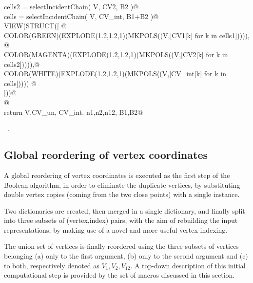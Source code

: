 \documentclass[11pt,oneside]{article}	%
\begin{document}
\begin{flushleft}
\begin{list}{}{}
\mbox{}\verb@   cells2 = selectIncidentChain( V, CV2, B2 )@\\
\mbox{}\verb@   cells = selectIncidentChain( V, CV_int, B1+B2 )@\\
\mbox{}\verb@   VIEW(STRUCT([ @\\
\mbox{}\verb@      COLOR(GREEN)(EXPLODE(1.2,1.2,1)(MKPOLS((V,[CV1[k] for k in cells1])))), @\\
\mbox{}\verb@      COLOR(MAGENTA)(EXPLODE(1.2,1.2,1)(MKPOLS((V,[CV2[k] for k in cells2])))),@\\
\mbox{}\verb@      COLOR(WHITE)(EXPLODE(1.2,1.2,1)(MKPOLS((V,[CV_int[k] for k in cells])))) @\\
\mbox{}\verb@      ]))@\\
\mbox{}\verb@   @\\
\mbox{}\verb@   return V,CV_un, CV_int, n1,n2,n12, B1,B2@\\
\mbox{}\verb@@{\NWsep}
\end{list}
\vspace{-1ex}
\footnotesize\addtolength{\baselineskip}{-1ex}
\begin{list}{}{\setlength{\itemsep}{-\parsep}\setlength{\itemindent}{-\leftmargin}}
\item \NWtxtMacroRefIn\ .
\end{list}
\end{flushleft}
\subsection{Global reordering of vertex coordinates}
A global reordering of vertex coordinates is executed as the first step of the Boolean algorithm, in order to eliminate the duplicate vertices, by substituting double vertex copies (coming from the two close points) with a single instance. 

Two dictionaries are created, then merged in a single dictionary, and finally split into three subsets of (vertex,index) pairs, with the aim of rebuilding the input representations, by making use of a novel and more useful vertex indexing.

The union set of vertices is finally reordered using the three subsets of vertices belonging (a) only to the first argument, (b) only to the second argument and (c) to both, respectively denoted as $V_1, V_2, V_{12}$. A top-down description of this initial computational step is provided by the set of macros discussed in this section.
\end{document}
